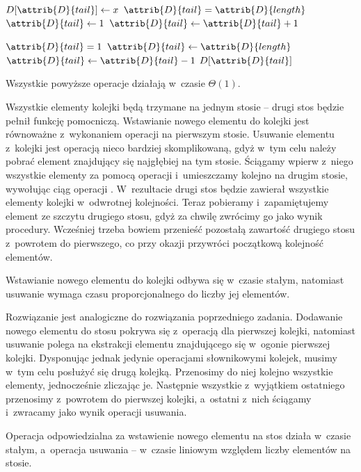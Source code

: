 \begin{codebox}
\li	$D[\attrib{D}{tail}]\gets x$
\li	\If $\attrib{D}{tail}=\attrib{D}{length}$
\li		\Then $\attrib{D}{tail}\gets1$
\li		\Else $\attrib{D}{tail}\gets\attrib{D}{tail}+1$
		\End
\end{codebox}

\begin{codebox}
\li	\If $\attrib{D}{tail}=1$
\li		\Then $\attrib{D}{tail}\gets\attrib{D}{length}$
\li		\Else $\attrib{D}{tail}\gets\attrib{D}{tail}-1$
		\End
\li	\Return $D[\attrib{D}{tail}]$
\end{codebox}

Wszystkie powyższe operacje działają w~czasie $\Theta(1)$.

\exercise %
Wszystkie elementy kolejki będą trzymane na jednym stosie -- drugi stos będzie pełnił funkcję pomocniczą.
Wstawianie nowego elementu do kolejki jest równoważne z~wykonaniem operacji  na pierwszym stosie.
Usuwanie elementu z~kolejki jest operacją nieco bardziej skomplikowaną, gdyż w~tym celu należy pobrać element znajdujący się najgłębiej na tym stosie.
Ściągamy wpierw z~niego wszystkie elementy za pomocą operacji  i~umieszczamy kolejno na drugim stosie, wywołując ciąg operacji .
W~rezultacie drugi stos będzie zawierał wszystkie elementy kolejki w~odwrotnej kolejności.
Teraz pobieramy i~zapamiętujemy element ze szczytu drugiego stosu, gdyż za chwilę zwrócimy go jako wynik procedury.
Wcześniej trzeba bowiem przenieść pozostałą zawartość drugiego stosu z~powrotem do pierwszego, co przy okazji przywróci początkową kolejność elementów.

Wstawianie nowego elementu do kolejki odbywa się w~czasie stałym, natomiast usuwanie wymaga czasu proporcjonalnego do liczby jej elementów.

\exercise %
Rozwiązanie jest analogiczne do rozwiązania poprzedniego zadania.
Dodawanie nowego elementu do stosu pokrywa się z~operacją  dla pierwszej kolejki, natomiast usuwanie polega na ekstrakcji elementu znajdującego się w~ogonie pierwszej kolejki.
Dysponując jednak jedynie operacjami słownikowymi kolejek, musimy w~tym celu posłużyć się drugą kolejką.
Przenosimy do niej kolejno wszystkie elementy, jednocześnie zliczając je.
Następnie wszystkie z~wyjątkiem ostatniego przenosimy z~powrotem do pierwszej kolejki, a~ostatni z~nich ściągamy i~zwracamy jako wynik operacji usuwania.

Operacja odpowiedzialna za wstawienie nowego elementu na stos działa w~czasie stałym, a~operacja usuwania -- w~czasie liniowym względem liczby elementów na stosie.
